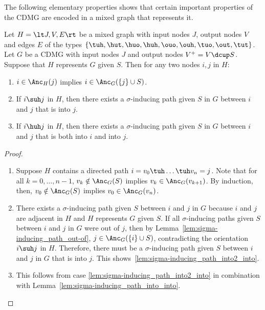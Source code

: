 The following elementary properties shows that certain important properties of the CDMG are encoded in a mixed graph that represents it.
\begin{Lem}\label{lem:mixed_graph_represents_CDMG}
  Let $H = \lt J,V,E\rt$ be a mixed graph with input nodes $J$, output nodes $V$ and edges $E$ of the types $\{\tuh,\hut,\huo,\huh,\ouo,\ouh,\tuo,\out,\tut\}$.
  Let $G$ be a CDMG with input nodes $J$ and output nodes $V^+ = V \dcup S$.
  Suppose that $H$ represents $G$ given $S$.
  Then for any two nodes $i,j$ in $H$: 
  \begin{enumerate}[label=(\roman*)]
    \item $i \in \Anc_{H}(j)$ implies $i \in \Anc_{G}(\{j\} \cup S)$.
    \item If $i \suh j$ in $H$, then there exists a $\sigma$-inducing path given $S$ in $G$ between $i$ and $j$ that is into $j$. \label{lem:sigma-inducing_path_into2_into}
    \item If $i \huh j$ in $H$, then there exists a $\sigma$-inducing path given $S$ in $G$ between $i$ and $j$ that is both into $i$ and into $j$. \label{lem:sigma-inducing_path_into2_intointo}
  \end{enumerate}
\end{Lem}
\begin{proof}
  \begin{enumerate}[label=(\roman*)]
    \item Suppose $H$ contains a directed path $i = v_0 \tuh \dots \tuh v_n = j$.
      Note that for all $k = 0, \dots, n-1$, $v_k \notin \Anc_G(S)$ implies $v_k \in \Anc_G(v_{k+1})$. %
      By induction, then, $v_0 \notin \Anc_G(S)$ implies $v_0 \in \Anc_G(v_n)$.
    \item There exists a $\sigma$-inducing path given $S$ between $i$ and $j$ in $G$ because $i$ and $j$ are adjacent in $H$ and $H$ represents $G$ given $S$.
      If all $\sigma$-inducing paths given $S$ between $i$ and $j$ in $G$ were out of $j$, then by Lemma~\ref{lem:sigma-inducing_path_out-of},
      $j \in \Anc_G(\{i\} \cup S)$, contradicting the orientation $i \suh j$ in $H$. 
      Therefore, there must be a $\sigma$-inducing path given $S$ between $i$ and $j$ in $G$ that is into $j$.
      This shows~\ref{lem:sigma-inducing_path_into2_into}.
    \item This follows from case \ref{lem:sigma-inducing_path_into2_into} in combination with Lemma~\ref{lem:sigma-inducing_path_into_into}.
  \end{enumerate}
\end{proof}

